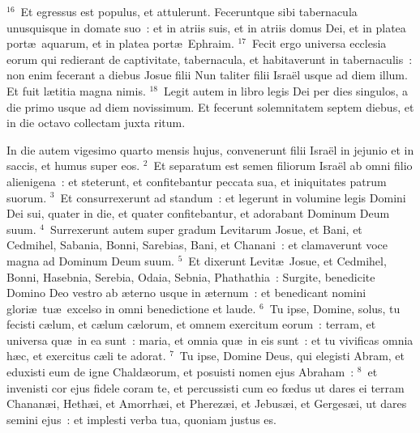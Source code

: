 ${}^{16}$~Et egressus est populus, et attulerunt. Feceruntque sibi tabernacula unusquisque in domate suo~: et in atriis suis, et in atriis domus Dei, et in platea port\ae\ aquarum, et in platea port\ae\ Ephraim.
${}^{17}$~Fecit ergo universa ecclesia eorum qui redierant de captivitate, tabernacula, et habitaverunt in tabernaculis~: non enim fecerant a diebus Josue filii Nun taliter filii Isra\"el usque ad diem illum. Et fuit l\ae titia magna nimis.
${}^{18}$~Legit autem in libro legis Dei per dies singulos, a die primo usque ad diem novissimum. Et fecerunt solemnitatem septem diebus, et in die octavo collectam juxta ritum.

\lettrine[lines=10,image=true,loversize=0.05,lraise=-0.03]{I}{}n die autem vigesimo quarto mensis hujus, convenerunt filii Isra\"el in jejunio et in saccis, et humus super eos.
${}^{2}$~Et separatum est semen filiorum Isra\"el ab omni filio alienigena~: et steterunt, et confitebantur peccata sua, et iniquitates patrum suorum.
${}^{3}$~Et consurrexerunt ad standum~: et legerunt in volumine legis Domini Dei sui, quater in die, et quater confitebantur, et adorabant Dominum Deum suum.
${}^{4}$~Surrexerunt autem super gradum Levitarum Josue, et Bani, et Cedmihel, Sabania, Bonni, Sarebias, Bani, et Chanani~: et clamaverunt voce magna ad Dominum Deum suum.
${}^{5}$~Et dixerunt Levit\ae\ Josue, et Cedmihel, Bonni, Hasebnia, Serebia, Odaia, Sebnia, Phathathia~: Surgite, benedicite Domino Deo vestro ab \ae terno usque in \ae ternum~: et benedicant nomini glori\ae\ tu\ae\ excelso in omni benedictione et laude.
${}^{6}$~Tu ipse, Domine, solus, tu fecisti c\ae lum, et c\ae lum c\ae lorum, et omnem exercitum eorum~: terram, et universa qu\ae\ in ea sunt~: maria, et omnia qu\ae\ in eis sunt~: et tu vivificas omnia h\ae c, et exercitus c\ae li te adorat.
${}^{7}$~Tu ipse, Domine Deus, qui elegisti Abram, et eduxisti eum de igne Chald\ae orum, et posuisti nomen ejus Abraham~:
${}^{8}$~et invenisti cor ejus fidele coram te, et percussisti cum eo fœdus ut dares ei terram Chanan\ae i, Heth\ae i, et Amorrh\ae i, et Pherez\ae i, et Jebus\ae i, et Gerges\ae i, ut dares semini ejus~: et implesti verba tua, quoniam justus es.


